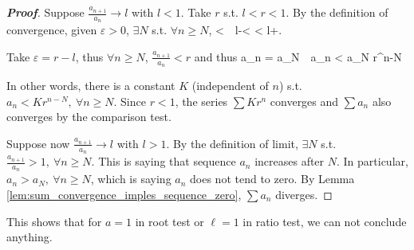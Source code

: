 \begin{proof}[{\bf Proof}]
Suppose $\frac{a_{n+1}}{a_n}\to l$ with $l<1$. Take $r$ s.t. $l<r<1$. By the definition of convergence, given $\varepsilon>0$, $\exists N$ s.t. $\forall n\geq N$,
\be
{}<\ve \ \ra \ l-\ve <  < l+\ve.
\ee

Take $\varepsilon=r-l$, thus $\forall n\geq N$, $\frac{a_{n+1}}{a_n} < r$ and thus
\be
a_n = \cdot{}\cdots \cdot {} \cdot a_N\ \ra \ a_n < a_N r^{n-N}
\ee

In other words, there is a constant $K$ (independent of $n$) s.t. $a_n < K r^{n-N}, \ \forall n\geq N$. Since $r<1$, the series $\sum Kr^n$ converges and $\sum a_n$ also converges by the comparison test.

Suppose now $\frac{a_{n+1}}{a_n}\to l$ with $l>1$. By the definition of limit, $\exists N$ s.t. $\frac{a_{n+1}}{a_n}>1,\ \forall n\geq N$. This is saying that sequence $a_n$ increases after $N$. In particular, $a_n>a_N,\ \forall n\geq N$, which is saying $a_n$ does not tend to zero. By Lemma \ref{lem:sum_convergence_imples_sequence_zero}, $\sum a_n$ diverges.
\end{proof}

\begin{remark}
This shows that for $a=1$ in root test or $\ell=1$ in ratio test, we can not conclude anything.
\end{remark}

